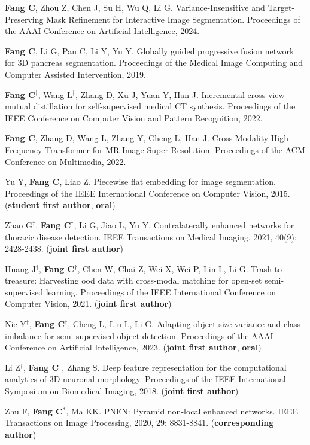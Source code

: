 \documentclass[a4paper,36pt]{article}
\newcommand{\tb}[1]{\textbf{#1}}
\newcommand{\resumeItemWithoutTitle}[1]{
  \item\justifying\small{
    {#1 \vspace{-2pt}}
  }
}
\begin{document}
\resumeItemWithoutTitle{\tb{Fang C}, Zhou Z, Chen J, Su H, Wu Q, Li G. Variance-Insensitive and Target-Preserving Mask Refinement for Interactive Image Segmentation. Proceedings of the AAAI Conference on Artificial Intelligence, 2024. }

\resumeItemWithoutTitle{\tb{Fang C}, Li G, Pan C, Li Y, Yu Y. Globally guided progressive fusion network for 3D pancreas segmentation. Proceedings of the Medical Image Computing and Computer Assisted Intervention, 2019.}

\resumeItemWithoutTitle{\tb{Fang C}$^{\dag}$, Wang L$^{\dag}$, Zhang D, Xu J, Yuan Y, Han J. Incremental cross-view mutual distillation for self-supervised medical CT synthesis. Proceedings of the IEEE Conference on Computer Vision and Pattern Recognition, 2022.}

\resumeItemWithoutTitle{\textbf{Fang C}, Zhang D, Wang L, Zhang Y, Cheng L, Han J. Cross-Modality High-Frequency Transformer for MR Image Super-Resolution. Proceedings of the ACM Conference on Multimedia, 2022. }

\resumeItemWithoutTitle{Yu Y, \tb{Fang C}, Liao Z. Piecewise flat embedding for image segmentation. Proceedings of the IEEE International Conference on Computer Vision, 2015. (\tb{student first author}, \tb{oral})}

\resumeItemWithoutTitle{Zhao G$^\dag$, \tb{Fang C}$^\dag$, Li G, Jiao L, Yu Y. Contralaterally enhanced networks for thoracic disease detection. IEEE Transactions on Medical Imaging, 2021, 40(9): 2428-2438. (\tb{joint first author}) }

\resumeItemWithoutTitle{Huang J$^\dag$, \tb{Fang C}$^\dag$, Chen W, Chai Z, Wei X, Wei P, Lin L, Li G. Trash to treasure: Harvesting ood data with cross-modal matching for open-set semi-supervised learning. Proceedings of the IEEE International Conference on Computer Vision, 2021. (\tb{joint first author})}

\resumeItemWithoutTitle{Nie Y$^{\dag}$, \tb{Fang C}$^{\dag}$, Cheng L, Lin L, Li G. Adapting object size variance and class imbalance for semi-supervised object detection. Proceedings of the AAAI Conference on Artificial Intelligence, 2023. (\tb{joint first author}, \tb{oral})}

\resumeItemWithoutTitle{Li Z$^\dag$, \tb{Fang C}$^\dag$, Zhang S. Deep feature representation for the computational analytics of 3D neuronal morphology. Proceedings of the IEEE International Symposium on Biomedical Imaging, 2018. (\tb{joint first author})}

\resumeItemWithoutTitle{Zhu F, \tb{Fang C}$^\ast$, Ma KK. PNEN: Pyramid non-local enhanced networks. IEEE Transactions on Image Processing, 2020, 29: 8831-8841. (\tb{corresponding author})}
\end{document}
